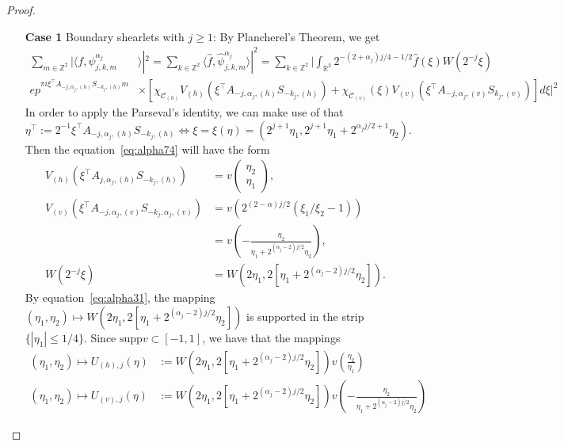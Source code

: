 \begin{proof}
\begin{itemize}
\begin{enumerate}
\item[\textbf{Case 1}] Boundary shearlets with $j\geq 1$: By Plancherel's Theorem, we get
\begin{equation}
\label{eq:alpha74}
\begin{aligned}
\sum_{m\in\mathbb{Z}^2} |\langle f,\psi_{j,k,m}^{\alpha_j}&\rangle|^2=\sum_{k\in\mathbb{Z}^2}\langle \hat{f},\hat{\psi}_{j,k,m}^{\alpha_j}\rangle |^2 =\sum_{k\in\mathbb{Z}^2}\bigg|\int_{\mathbb{R}^2}2^{-(2+\alpha_j)j/4-1/2}\hat{f}(\xi)W(2^{-j}\xi)\\
ep^{\pi i\xi^{\top}A_{-j,\alpha_j,(h)}S_{-k_j,(h)}m}&\times[\chi_{\mathcal{C}_{(h)}}V_{(h)}(\xi^{\top}A_{-j,\alpha_j,(h)}S_{-k_j,(h)})+\chi_{\mathcal{C}_{(v)}}(\xi)V_{(v)}(\xi^{\top}A_{-j,\alpha_j,(v)}S_{k_j,(v)})]d\xi\bigg|^2
\end{aligned}
\end{equation}
In order to apply the Parseval's identity, we can make use of that
$$
\eta^{\top}:=2^{-1}\xi^{\top}A_{-j,\alpha_{j},(h)}S_{-k_j,(h)}\Leftrightarrow \xi=\xi(\eta)=(2^{j+1}\eta_1,2^{j+1}\eta_1+2^{\alpha_j j/2+1}\eta_2).
$$
Then the equation~\ref{eq:alpha74} will have the form
$$
\begin{aligned}
V_{(h)}\left(\xi^{\top}A_{j,\alpha_j,(h)}S_{-k_j,(h)}\right)&=v\left(\begin{matrix}\eta_2\\ \eta_1\end{matrix}\right),\\
V_{(v)}\left(\xi^{\top}A_{-j,\alpha_j,(v)}S_{-k_j,\alpha_j,(v)}\right)&=v\left(2^{(2-\alpha)j/2}(\xi_1/\xi_2-1)\right)\\
 &= v\left(-\frac{\eta_2}{\eta_1+2^{(\alpha_j-2)j/2}\eta_2}\right),\\
W(2^{-j}\xi)&=W\left(2\eta_1,2[\eta_1+2^{(\alpha_j-2)j/2}\eta_2]\right).
\end{aligned}
$$
By equation~\ref{eq:alpha31}, the mapping $(\eta_1,\eta_2)\mapsto W(2\eta_1,2[\eta_1+2^{(\alpha_j-2)j/2}\eta_2])$ is supported in the strip $\{|\eta_1|\leq 1/4\}$. Since $\text{supp}v\subset [-1,1]$, we have that the mappings
$$
\begin{aligned}
(\eta_1,\eta_2)\mapsto U_{(h),j}(\eta)&:=W(2\eta_1,2[\eta_1+2^{(\alpha_j-2)j/2}\eta_2])v\left(\frac{\eta_2}{\eta_1}\right)\\
(\eta_1,\eta_2)\mapsto U_{(v),j}(\eta)&:=W(2\eta_1,2[\eta_1+2^{(\alpha_j-2)j/2}\eta_2])v\left(-\frac{\eta_2}{\eta_1+2^{(\alpha_j-2)j/2}\eta_2}\right)
\end{aligned}
$$
\end{enumerate}
\end{itemize}
\end{proof}
